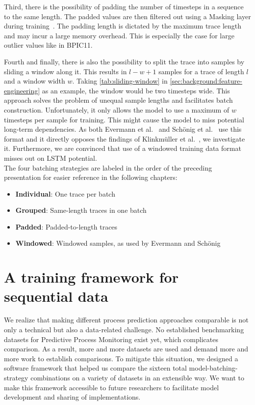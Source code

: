 Third, there is the possibility of padding the number of timesteps in a sequence to the same length.
The padded values are then filtered out using a Masking layer during training~\cite{web:keras}.
The padding length is dictated by the maximum trace length and may incur a large memory overhead.
This is especially the case for large outlier values like in BPIC11.

Fourth and finally, there is also the possibility to split the trace into samples by sliding a window along it.
This results in $l-w+1$ samples for a trace of length $l$ and a window width $w$.
Taking \autoref{tab:sliding-window} in \autoref{sec:background:feature-engineering} as an example, the window would be two timesteps wide.
This approach solves the problem of unequal sample lengths and facilitates batch construction.
Unfortunately, it only allows the model to use a maximum of $w$ timesteps per sample for training.
This might cause the model to miss potential long-term dependencies.
As both Evermann et al.~\cite{evermann2016} and Schönig et al.~\cite{schoenig2018} use this format and it directly opposes the findings of Klinkmüller et al.~\cite{klinkmuller2018reliablemonitoring}, we investigate it.
Furthermore, we are convinced that use of a windowed training data format misses out on LSTM potential.\\

The four batching strategies are labeled in the order of the preceding presentation for easier reference in the following chapters:
\begin{itemize}
\item\textbf{Individual}: One trace per batch
\item\textbf{Grouped}: Same-length traces in one batch
\item\textbf{Padded}: Padded-to-length traces
\item\textbf{Windowed}: Windowed samples, as used by Evermann and Schönig
\end{itemize}

\section{A training framework for sequential data}
\label{sec:contrib:training-framework}
We realize that making different process prediction approaches comparable is not only a technical but also a data-related challenge.
No established benchmarking datasets for Predictive Process Monitoring exist yet, which complicates comparison.
As a result, more and more datasets are used and demand more and more work to establish comparisons.
To mitigate this situation, we designed a software framework that helped us compare the sixteen total model-batching-strategy combinations on a variety of datasets in an extensible way.
We want to make this framework accessible to future researchers to facilitate model development and sharing of implementations.\\

